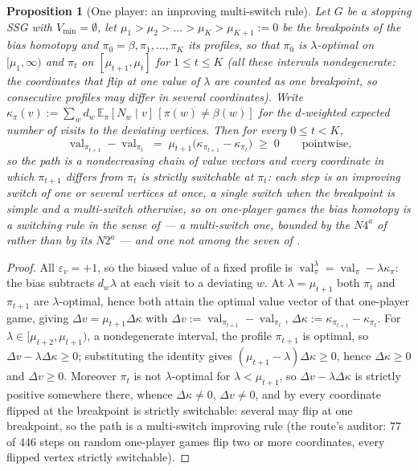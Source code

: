 \documentclass[11pt]{article}
\theoremstyle{plain}
\newtheorem{proposition}[theorem]{Proposition}
\theoremstyle{definition}
\DeclareMathOperator{\val}{val}
\newcommand{\Vmin}{V_{\min}}
\begin{document}
\begin{proposition}[One player: an improving multi-switch rule]\label{prop:bias-one-improving}
Let $G$ be a stopping SSG with $\Vmin=\emptyset$, let
$\mu_1>\mu_2>\dots>\mu_K>\mu_{K+1}:=0$ be the breakpoints of the bias homotopy
and $\pi_0=\beta,\pi_1,\dots,\pi_K$ its profiles, so that $\pi_0$ is
$\lambda$-optimal on $[\mu_1,\infty)$ and $\pi_t$ on $[\mu_{t+1},\mu_t]$ for
$1\le t\le K$ (all these intervals nondegenerate: the coordinates that
flip at one value of $\lambda$ are counted as one breakpoint, so
consecutive profiles may differ in several coordinates).
Write $\kappa_\pi(v):=\sum_{w}d_w\,\mathbb E_\pi[N_w\mid v]\,[\pi(w)\ne\beta(w)]$
for the $d$-weighted expected number of visits to the deviating vertices.
Then for every $0\le t<K$,
\[
  \val_{\pi_{t+1}}-\val_{\pi_t}\;=\;\mu_{t+1}\bigl(\kappa_{\pi_{t+1}}-\kappa_{\pi_t}\bigr)\;\ge\;0
  \qquad\text{pointwise,}
\]
so the path is a nondecreasing chain of value vectors and every coordinate
in which $\pi_{t+1}$ differs from $\pi_t$ is strictly switchable at
$\pi_t$: each step is an improving switch of one or several vertices at
once, a single switch when the breakpoint is simple and a multi-switch
otherwise, so on one-player games the bias homotopy is a switching rule in
the sense of  --- a multi-switch one, bounded by the
$N4^{a}$ of  rather than by its $N2^{a}$ --- and one
not among the seven of .
\end{proposition}

\begin{proof}
All $\varepsilon_v=+1$, so the biased value of a fixed profile is
$\val^{\lambda}_\pi=\val_\pi-\lambda\kappa_\pi$: the bias subtracts
$d_w\lambda$ at each visit to a deviating $w$. At $\lambda=\mu_{t+1}$ both
$\pi_t$ and $\pi_{t+1}$ are $\lambda$-optimal, hence both attain the optimal
value vector of that one-player game, giving
$\Delta v=\mu_{t+1}\Delta\kappa$ with
$\Delta v:=\val_{\pi_{t+1}}-\val_{\pi_t}$,
$\Delta\kappa:=\kappa_{\pi_{t+1}}-\kappa_{\pi_t}$. For
$\lambda\in[\mu_{t+2},\mu_{t+1})$, a nondegenerate interval, the profile
$\pi_{t+1}$ is optimal, so $\Delta v-\lambda\Delta\kappa\ge0$; substituting
the identity gives $(\mu_{t+1}-\lambda)\Delta\kappa\ge0$, hence
$\Delta\kappa\ge0$ and $\Delta v\ge0$. Moreover $\pi_t$ is not $\lambda$-optimal for $\lambda<\mu_{t+1}$, so
$\Delta v-\lambda\Delta\kappa$ is strictly positive somewhere there, whence
$\Delta\kappa\ne0$, $\Delta v\ne0$, and by 
every coordinate flipped at the breakpoint is strictly switchable: several
may flip at one breakpoint, so the path is a multi-switch improving rule
(the route's auditor: $77$ of $446$ steps on random one-player games flip
two or more coordinates, every flipped vertex strictly switchable).
\end{proof}
\end{document}
